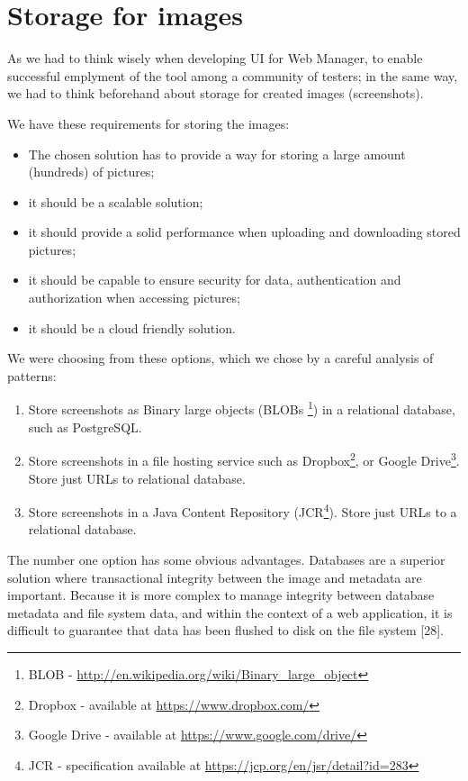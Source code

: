 \documentclass[11pt,oneside,final]{fithesis2}
\begin{document}
\section{Storage for images}
\label{chap:storage}
    As we had to think wisely when developing UI for Web Manager, to enable successful emplyment of the tool among a community of 
    testers; in the same way, we had to think beforehand about storage for created images (screenshots). 
    
    We have these requirements for storing the images:
    
    \begin{itemize}
     \item The chosen solution has to provide a way for storing a large amount (hundreds) of pictures;
     \item it should be a scalable solution;
     \item it should provide a solid performance when uploading and downloading stored pictures;
     \item it should be capable to ensure security for data, authentication and authorization when accessing pictures;
     \item it should be a cloud friendly solution.
    \end{itemize}
 
    We were choosing from these options, which we chose by a careful analysis of patterns:
    \begin{enumerate}
     \item Store screenshots as Binary large objects (BLOBs 
	   \footnote{BLOB - \url{http://en.wikipedia.org/wiki/Binary_large_object}}) in a relational
	   database, such as PostgreSQL.
     \item Store screenshots in a file hosting service such as Dropbox\footnote{Dropbox - available at \url{https://www.dropbox.com/}}, 
     or Google Drive\footnote{Google Drive - available at \url{https://www.google.com/drive/}}. Store just URLs to relational database.
     \item Store screenshots in a Java Content Repository (JCR\footnote{JCR - specification available at 
	   \url{https://jcp.org/en/jsr/detail?id=283}}). Store just URLs to a relational database.
    \end{enumerate}

    The number one option has some obvious advantages. Databases are a superior solution where transactional integrity between the
    image and metadata are important. Because it is more complex to manage integrity between database metadata and file system data, 
    and within the context of a web application, it is difficult to guarantee that data has been flushed to disk on the file system [28].
    
\end{document}
